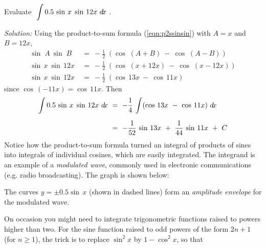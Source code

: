 \begin{exmp}\label{exmp:trigint1}
\noindent Evaluate $~\displaystyle\int 0.5\,\sin\,x\;\sin\,12x~d\!x~$.\vspace{1mm}
\par\noindent\emph{Solution:} Using the product-to-sum formula
(\ref{eqn:p2ssinsin}) with $A=x$ and $B=12x$, 
\begin{align*}
\sin\;A~\sin\;B ~&=~ -\tfrac{1}{2}\;(\cos\;(A+B) ~-~ \cos\;(A-B))\\
\sin\,x~\sin\,12x ~&=~ -\tfrac{1}{2}\;(\cos\;(x+12x) ~-~ \cos\;(x-12x))\\
\sin\,x~\sin\,12x ~&=~ -\tfrac{1}{2}\;(\cos\,13x ~-~ \cos\,11x)
\end{align*}
since $\cos\,(-11x) = \cos\,11x$. Then
\begin{align*}
\int 0.5\,\sin\,x\;\sin\,12x~d\!x ~&=~ -\frac{1}{4}\,\int (\cos\,13x ~-~ \cos\,11x)~d\!x\\[6pt]
&=~ -\frac{1}{52}\,\sin\,13x ~+~ \frac{1}{44}\,\sin\,11x ~+~ C
\end{align*}
Notice how the product-to-sum formula turned an integral of products of sines
into integrals of individual cosines, which are easily integrated. The integrand
is an example of a \emph{modulated wave}, commonly used in
electronic communications (e.g. radio broadcasting). The graph is shown below:
\begin{center}
\end{center}
The curves $y=\pm 0.5 \sin\,x$ (shown in dashed lines) form an \emph{amplitude
envelope} for the modulated wave.
\end{exmp}\vspace{-2mm}
\divider
\newpage
On occasion you might need to integrate trigonometric functions raised to powers
higher than two. For the sine function raised to odd powers of the form $2n+1$
(for $n \ge 1$), the trick is to replace $\sin^2 x$ by $1 - \cos^2 x$, so that

